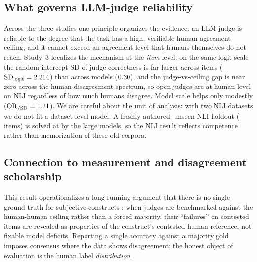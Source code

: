 \subsection{What governs LLM-judge reliability}
Across the three studies one principle organizes the evidence: an LLM judge is reliable to the degree that the task
has a high, verifiable human-agreement ceiling, and it cannot exceed an agreement level that humans themselves do
not reach. Study~3 localizes the mechanism at the \emph{item} level: on the same logit scale the random-intercept SD
of judge correctness is far larger across items ($\mathrm{SD}_{\text{logit}}=2.214$) than across models
($0.30$), and the judge-vs-ceiling gap is near zero across the human-disagreement spectrum, so open
judges are at human level on NLI regardless of how much humans disagree. Model scale helps only modestly
($\mathrm{OR}_{/\mathrm{SD}}=1.21$). We are careful about the unit of analysis: with two NLI datasets we do
not fit a dataset-level model. A freshly authored, unseen NLI holdout (\FNn{} items) is solved at \FNbest{} by the large models, so the NLI
result reflects competence rather than memorization of these old corpora.

\subsection{Connection to measurement and disagreement scholarship}
This result operationalizes a long-running argument that there is no single ground truth for subjective constructs
\citep{aroyo2015truth,plank2022humanlabel}: when judges are benchmarked against the human-human ceiling rather than a
forced majority, their ``failures'' on contested items are revealed as properties of the construct's contested human reference, not fixable model deficits. Reporting a single accuracy against a majority gold imposes
consensus where the data shows disagreement; the honest object of evaluation is the human label \emph{distribution}.

